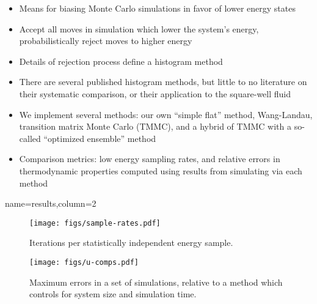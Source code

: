 \documentclass[paperwidth=48in,paperheight=36in,
fontscale=0.27,margin=0.75in]{baposter}
\begin{document}
\begin{poster}
{    %



    \begin{itemize}
    \item Means for biasing Monte Carlo simulations in favor of lower
      energy states
    \item Accept all moves in simulation which lower the system's
      energy, probabilistically reject moves to higher energy
    \item Details of rejection process define a histogram method
    \item There are several published histogram methods, but little to
      no literature on their systematic comparison, or their
      application to the square-well fluid
    \item We implement several methods: our own ``simple flat''
      method, Wang-Landau, transition matrix Monte Carlo (TMMC), and a
      hybrid of TMMC with a so-called ``optimized ensemble'' method
    \item Comparison metrics: low energy sampling rates, and relative
      errors in thermodynamic properties computed using results from
      simulating via each method
    \end{itemize}

  }

  {name=results,column=2}{%

    \begin{figure}[H]
      \centering
      \texttt{[image: figs/sample-rates.pdf]}
      \caption{Iterations per statistically independent energy
        sample.}
      \label{fig:sample_rates}
    \end{figure}
    \begin{figure}[H]
      \centering
      \texttt{[image: figs/u-comps.pdf]}
      \caption{Maximum errors in a set of simulations, relative to a
        method which controls for system size and simulation time.}
      \label{fig:errors}
    \end{figure}

}
\end{poster}
\end{document}
